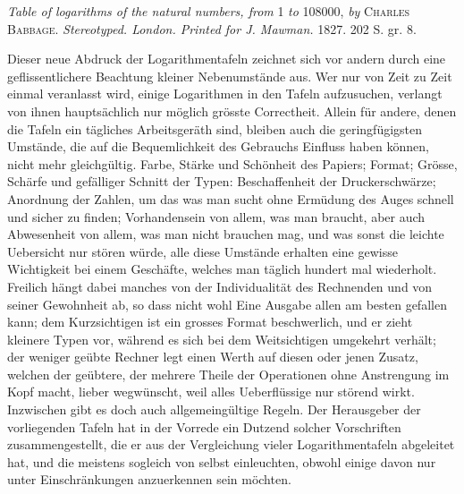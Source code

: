 \noindent\textit{Table of logarithms of the natural numbers, from} 1 \textit{to} 108000, \textit{by} \textsc{Charles}
\textsc{Babbage.} \textit{Stereotyped. London. Printed for J. Mawman.} 1827. 202 S. gr. 8.

Dieser neue Abdruck der Logarithmentafeln zeichnet sich vor andern durch
eine geflissentlichere Beachtung kleiner Nebenumstände aus. Wer nur von Zeit
zu Zeit einmal veranlasst wird, einige Logarithmen in den Tafeln aufzusuchen,
verlangt von ihnen hauptsächlich nur möglich grösste Correctheit. Allein für andere, denen die Tafeln ein tägliches Arbeitsgeräth sind, bleiben auch die geringfügigsten Umstände, die auf die Bequemlichkeit des Gebrauchs Einfluss haben
können, nicht mehr gleichgültig. Farbe, Stärke und Schönheit des Papiers;
Format; Grösse, Schärfe und gefälliger Schnitt der Typen: Beschaffenheit der
Druckerschwärze; Anordnung der Zahlen, um das was man sucht ohne Ermüdung des Auges schnell und sicher zu finden; Vorhandensein von allem, was man
braucht, aber auch Abwesenheit von allem, was man nicht brauchen mag, und
was sonst die leichte Uebersicht nur stören würde, alle diese Umstände erhalten
eine gewisse Wichtigkeit bei einem Geschäfte, welches man täglich hundert mal
wiederholt. Freilich hängt dabei manches von der Individualität des Rechnenden
und von seiner Gewohnheit ab, so dass nicht wohl Eine Ausgabe allen am besten
gefallen kann; dem Kurzsichtigen ist ein grosses Format beschwerlich, und er
zieht kleinere Typen vor, während es sich bei dem Weitsichtigen umgekehrt verhält; der weniger geübte Rechner legt einen Werth auf diesen oder jenen Zusatz,
welchen der geübtere, der mehrere Theile der Operationen ohne Anstrengung im
Kopf macht, lieber wegwünscht, weil alles Ueberflüssige nur störend wirkt. Inzwischen gibt es doch auch allgemeingültige Regeln. Der Herausgeber der vorliegenden Tafeln hat in der Vorrede ein Dutzend solcher Vorschriften zusammengestellt, die er aus der Vergleichung vieler Logarithmentafeln abgeleitet hat, und
die meistens sogleich von selbst einleuchten, obwohl einige davon nur unter Einschränkungen anzuerkennen sein möchten.


